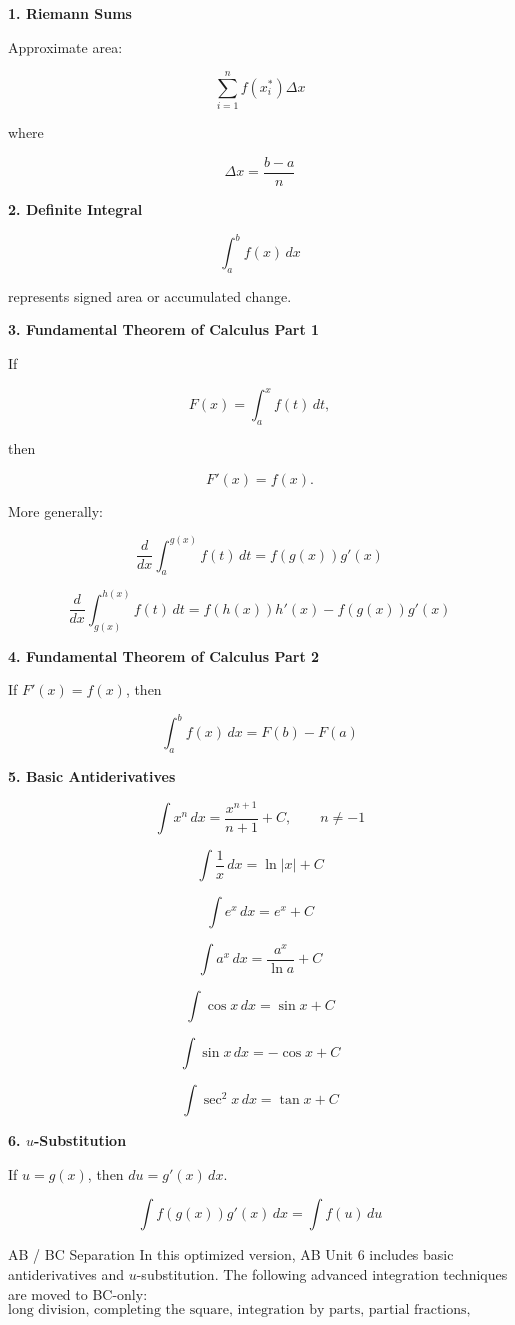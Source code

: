 \documentclass[11pt]{article}
\newcommand{\subtopic}[1]{
\vspace{0.45em}
\textcolor{novelPurpleDark}{\textbf{#1}}
}
\begin{document}
\subtopic{1. Riemann Sums}

Approximate area:

\[
\sum_{i=1}^n f(x_i^*)\Delta x
\]

where

\[
\Delta x=\frac{b-a}{n}
\]

\subtopic{2. Definite Integral}

\[
\int_a^b f(x)\,dx
\]

represents signed area or accumulated change.

\subtopic{3. Fundamental Theorem of Calculus Part 1}

If

\[
F(x)=\int_a^x f(t)\,dt,
\]

then

\[
F'(x)=f(x).
\]

More generally:

\[
\frac{d}{dx}\int_a^{g(x)} f(t)\,dt=f(g(x))g'(x)
\]

\[
\frac{d}{dx}\int_{g(x)}^{h(x)} f(t)\,dt=f(h(x))h'(x)-f(g(x))g'(x)
\]

\subtopic{4. Fundamental Theorem of Calculus Part 2}

If \(F'(x)=f(x)\), then

\[
\int_a^b f(x)\,dx=F(b)-F(a)
\]

\subtopic{5. Basic Antiderivatives}

\[
\int x^n\,dx=\frac{x^{n+1}}{n+1}+C,\qquad n\neq -1
\]

\[
\int \frac1x\,dx=\ln|x|+C
\]

\[
\int e^x\,dx=e^x+C
\]

\[
\int a^x\,dx=\frac{a^x}{\ln a}+C
\]

\[
\int \cos x\,dx=\sin x+C
\]

\[
\int \sin x\,dx=-\cos x+C
\]

\[
\int \sec^2x\,dx=\tan x+C
\]

\subtopic{6. \(u\)-Substitution}

If \(u=g(x)\), then \(du=g'(x)\,dx\).

\[
\int f(g(x))g'(x)\,dx=\int f(u)\,du
\]

\begin{warningbox}{AB / BC Separation}
In this optimized version, AB Unit 6 includes basic antiderivatives and \(u\)-substitution.  
The following advanced integration techniques are moved to BC-only:
\[
\text{long division, completing the square, integration by parts, partial fractions, improper integrals.}
\]
\end{warningbox}
\end{document}
